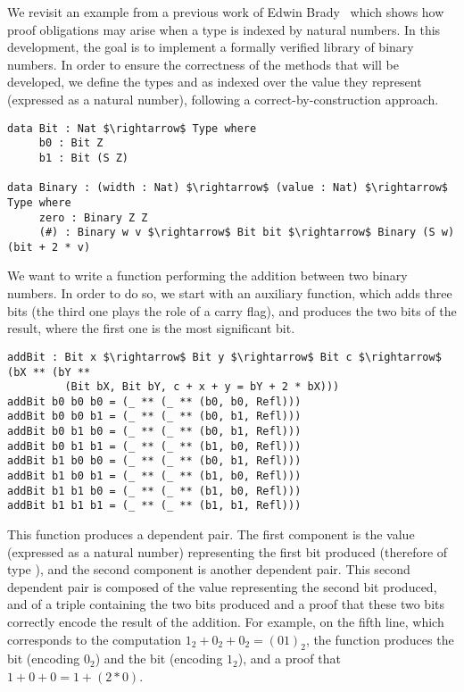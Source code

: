 We revisit an example from a previous work of Edwin Brady~\cite{DBLP:conf/plpv/Brady13} which shows how proof obligations may arise when a type is indexed by natural numbers. In this development, the goal is to implement a formally verified library of binary numbers. In order to ensure the correctness of the methods that will be developed, we define the types  and  as indexed over the value they represent (expressed as a natural number), following a correct-by-construction approach.

\begin{lstlisting}
data Bit : Nat $\rightarrow$ Type where
     b0 : Bit Z
     b1 : Bit (S Z)
     
data Binary : (width : Nat) $\rightarrow$ (value : Nat) $\rightarrow$ Type where
     zero : Binary Z Z
     (#) : Binary w v $\rightarrow$ Bit bit $\rightarrow$ Binary (S w) (bit + 2 * v)
\end{lstlisting}

We want to write a function performing the addition between two binary numbers. In order to do so, we start with an auxiliary function, which adds three bits
(the third one plays the role of a carry flag), and produces the two bits of
the result, where the first one is the most significant bit. 

\begin{lstlisting}
addBit : Bit x $\rightarrow$ Bit y $\rightarrow$ Bit c $\rightarrow$ (bX ** (bY ** 
         (Bit bX, Bit bY, c + x + y = bY + 2 * bX)))
addBit b0 b0 b0 = (_ ** (_ ** (b0, b0, Refl)))
addBit b0 b0 b1 = (_ ** (_ ** (b0, b1, Refl)))
addBit b0 b1 b0 = (_ ** (_ ** (b0, b1, Refl)))
addBit b0 b1 b1 = (_ ** (_ ** (b1, b0, Refl)))
addBit b1 b0 b0 = (_ ** (_ ** (b0, b1, Refl)))
addBit b1 b0 b1 = (_ ** (_ ** (b1, b0, Refl)))
addBit b1 b1 b0 = (_ ** (_ ** (b1, b0, Refl)))
addBit b1 b1 b1 = (_ ** (_ ** (b1, b1, Refl)))
\end{lstlisting}

This function produces a dependent pair. The first component is the value  (expressed as a natural number) representing the first bit produced (therefore of type ), and the second component is another dependent pair. This second dependent pair is composed of the value  representing the second bit produced, and of a triple containing the two bits produced and a proof that these two bits correctly encode the result of the addition.
For example, on the fifth line, which corresponds to the computation $1_2 + 0_2 + 0_2 = (01)_2$, the function produces the bit  (encoding $0_2$) and the bit  (encoding $1_2$), and a proof that $1 + 0 + 0 = 1 + (2*0)$.

